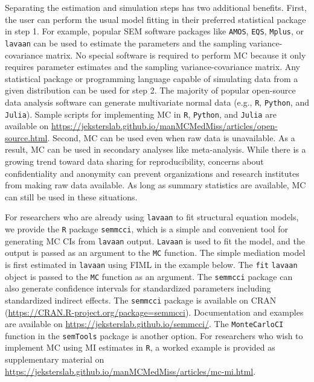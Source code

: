 \documentclass[man]{apa7}\usepackage[]{graphicx}\usepackage[]{xcolor}
\begin{document}
Separating the estimation and simulation steps has two additional benefits.
First,
the user can perform the usual model fitting in their preferred statistical package in step 1.
For example,
popular SEM software packages like 
\texttt{AMOS},
\texttt{EQS},
\texttt{Mplus},
or
\texttt{lavaan}
can be used to estimate the parameters
and the sampling variance-covariance matrix.
No special software is required to perform MC because it only requires parameter estimates and the sampling variance-covariance matrix.
Any statistical package or programming language capable of simulating data from a given distribution can be used for step 2.
The majority of popular open-source data analysis software can generate multivariate normal data 
(e.g.,
\texttt{R},
\texttt{Python},
and
\texttt{Julia}).
Sample scripts for implementing MC in
\texttt{R},
\texttt{Python},
and
\texttt{Julia}
are available on
\url{https://jeksterslab.github.io/manMCMedMiss/articles/open-source.html}. 
Second,
MC can be used even when raw data is unavailable.
As a result,
MC can be used in secondary analyses like meta-analysis.
While there is a growing trend toward data sharing for reproducibility,
concerns about confidentiality and anonymity can prevent organizations and research institutes from making raw data available.
As long as summary statistics are available,
MC can still be used in these situations.

For researchers who are already using \texttt{lavaan} to fit structural equation models,
we provide the \texttt{R} package \texttt{semmcci},
which is a simple and convenient tool for generating MC CIs from \texttt{lavaan} output.
\texttt{Lavaan} is used to fit the model,
and the output is passed as an argument to the \texttt{MC} function.
The simple mediation model is first estimated in \texttt{lavaan} using FIML in the example below.
The \texttt{fit} \texttt{lavaan} object is passed to the \texttt{MC} function as an argument.
The \texttt{semmcci} package can also generate confidence intervals for standardized parameters including standardized indirect effects. The \texttt{semmcci} package is available on CRAN (\url{https://CRAN.R-project.org/package=semmcci}). 
Documentation and examples are available on \url{https://jeksterslab.github.io/semmcci/}.
The \texttt{MonteCarloCI} function in the \texttt{semTools}
\parencite{Lib-Structural-Equation-Modeling-Software-Manuals-Jorgensen-2022} package is another option.
For researchers who wish to implement MC using MI estimates in \texttt{R},
a worked example is provided as supplementary material on
\url{https://jeksterslab.github.io/manMCMedMiss/articles/mc-mi.html}.
\end{document}
